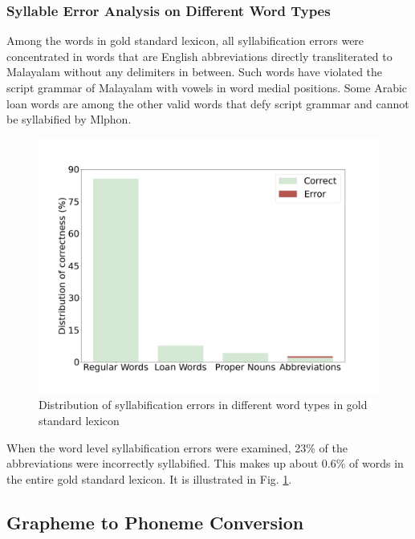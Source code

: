 \subsubsection{Syllable Error Analysis on Different Word Types}
\label{sec:Mlphon-errorsyl}

Among the words in gold standard lexicon, all syllabification errors were
concentrated in words that are English abbreviations directly transliterated to
Malayalam without any delimiters in between. Such words have violated the
script grammar of Malayalam with vowels in word medial positions. Some Arabic
loan words are among the other valid words that defy script grammar and cannot
be syllabified by Mlphon.

\begin{figure}[ht]
	\centering
	\includegraphics[width=0.8\linewidth]{syllable-error.jpg}
	\caption{Distribution of syllabification errors in different word types in gold standard lexicon}
	\label{fig:syllable-error}
\end{figure}

When the word level syllabification errors were examined, 23\% of the
abbreviations were incorrectly syllabified. This makes up about 0.6\% of words
in the entire gold standard lexicon. It is illustrated in Fig.
\ref{fig:syllable-error}.

\subsection{Grapheme to Phoneme Conversion}



